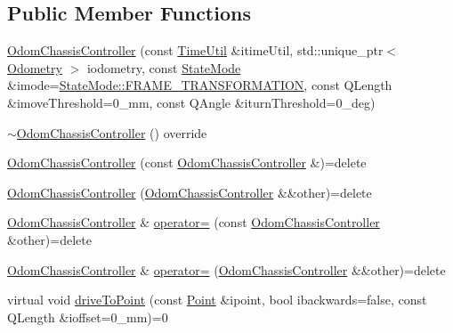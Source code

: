 \subsection*{Public Member Functions}
\begin{DoxyCompactItemize}
\item 
\mbox{\hyperlink{classokapi_1_1OdomChassisController_a3a550eef9b0030b6057eeaf8c5a3bb51}{Odom\+Chassis\+Controller}} (const \mbox{\hyperlink{classokapi_1_1TimeUtil}{Time\+Util}} \&itime\+Util, std\+::unique\+\_\+ptr$<$ \mbox{\hyperlink{classokapi_1_1Odometry}{Odometry}} $>$ iodometry, const \mbox{\hyperlink{namespaceokapi_af37fbd761bd859a00ff4dd4a87dd8c07}{State\+Mode}} \&imode=\mbox{\hyperlink{namespaceokapi_af37fbd761bd859a00ff4dd4a87dd8c07ad5ed7666e5cebf60d3af20a5a46edf3b}{State\+Mode\+::\+F\+R\+A\+M\+E\+\_\+\+T\+R\+A\+N\+S\+F\+O\+R\+M\+A\+T\+I\+ON}}, const Q\+Length \&imove\+Threshold=0\+\_\+mm, const Q\+Angle \&iturn\+Threshold=0\+\_\+deg)
\item 
\mbox{\hyperlink{classokapi_1_1OdomChassisController_a25ee4fe0432b6cdc8052a869856cfc7c}{$\sim$\+Odom\+Chassis\+Controller}} () override
\item 
\mbox{\hyperlink{classokapi_1_1OdomChassisController_ad9b7ee54f60d1974c2824f8fbcff1304}{Odom\+Chassis\+Controller}} (const \mbox{\hyperlink{classokapi_1_1OdomChassisController}{Odom\+Chassis\+Controller}} \&)=delete
\item 
\mbox{\hyperlink{classokapi_1_1OdomChassisController_a841d9679487509c9805e030ad7a663a9}{Odom\+Chassis\+Controller}} (\mbox{\hyperlink{classokapi_1_1OdomChassisController}{Odom\+Chassis\+Controller}} \&\&other)=delete
\item 
\mbox{\hyperlink{classokapi_1_1OdomChassisController}{Odom\+Chassis\+Controller}} \& \mbox{\hyperlink{classokapi_1_1OdomChassisController_abf1d2bbcacf41866867e03e7bdd68f06}{operator=}} (const \mbox{\hyperlink{classokapi_1_1OdomChassisController}{Odom\+Chassis\+Controller}} \&other)=delete
\item 
\mbox{\hyperlink{classokapi_1_1OdomChassisController}{Odom\+Chassis\+Controller}} \& \mbox{\hyperlink{classokapi_1_1OdomChassisController_ab0f6b3231dde46d04d570ec31caf7495}{operator=}} (\mbox{\hyperlink{classokapi_1_1OdomChassisController}{Odom\+Chassis\+Controller}} \&\&other)=delete
\item 
virtual void \mbox{\hyperlink{classokapi_1_1OdomChassisController_abea9bd3860ad9f1acb1cdc1e36869fbf}{drive\+To\+Point}} (const \mbox{\hyperlink{structokapi_1_1Point}{Point}} \&ipoint, bool ibackwards=false, const Q\+Length \&ioffset=0\+\_\+mm)=0

\end{DoxyCompactItemize}
